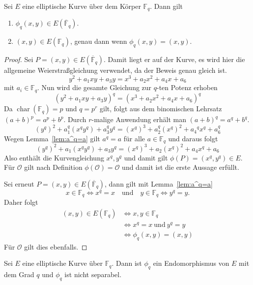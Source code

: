 \begin{lemma}\label{lem:frobenius-fixpunkte}
    Sei $E$ eine elliptische Kurve über dem Körper $\mathbb{F}_q$. Dann gilt
    \begin{enumerate}
        \item \(\phi_q(x,y)\in E(\overline{\mathbb{F}}_q)\).
        \item \((x,y)\in E(\mathbb{F}_q)\), genau dann wenn \(\phi_q(x,y)=(x,y)\).
    \end{enumerate}
\end{lemma}
\begin{proof}
    Sei $P=(x,y)\in E(\overline{\mathbb{F}}_q)$. Damit liegt er auf der Kurve, es wird hier die allgemeine Weierstraßgleichung verwendet, da der Beweis genau gleich ist.
    \[y^2+a_1xy+a_3y=x^3+a_2x^2+a_4x+a_6\] mit $a_i\in \mathbb{F}_q$.
    Nun wird die gesamte Gleichung zur $q$-ten Potenz erhoben
    \[
        {(y^2+a_1xy+a_3y)}^q={(x^3+a_2x^2+a_4x+a_6)}^q
    \]
    Da $\operatorname{char}(\mathbb F_q)=p$ und $q=p^r$ gilt, folgt aus dem binomischen Lehrsatz ${(a+b)}^p=a^p+b^p$. Durch $r$-malige Anwendung erhält man ${(a+b)}^q=a^q+b^q$.
    \[
        {(y^q)}^2+a_1^q(x^q y^q)+a_3^q y^q={(x^q)}^3+a_2^q{(x^q)}^2+{a_4}^q x^q+a_6^q
    \]
    Wegen Lemma~\ref{lem:a^q=a} gilt $a^q=a$ für alle $a\in\mathbb{F}_q$ und daraus folgt
    \[
        {(y^q)}^2+a_1(x^q y^q)+a_3 y^q={(x^q)}^3+a_2{(x^q)}^2+a_4 x^q+a_6
    \]
    Also enthält die Kurvengleichung $x^q,y^q$ und damit gilt $\phi(P)=(x^q,y^q)\in E$. Für $\mathcal{O}$ gilt nach Definition $\phi(\mathcal{O})=\mathcal{O}$ und damit ist die erste Aussage erfüllt.

    Sei erneut $P=(x,y)\in E(\overline{\mathbb F}_q)$, dann gilt mit Lemma~\ref{lem:a^q=a}
    \[
        x\in\mathbb F_q\iff x^q=x
        \quad\text{und}\quad
        y\in\mathbb F_q\iff y^q=y.
    \]
    Daher folgt
    \begin{align*}
        (x,y)\in E(\mathbb{F}_q) & \iff x,y\in\mathbb{F}_q         \\
                                 & \iff x^q=x  \ \text{und}\ y^q=y \\
                                 & \iff \phi_q(x,y)=(x,y)
    \end{align*}
    Für $\mathcal O$ gilt dies ebenfalls.
\end{proof}
\begin{lemma}\label{lem:frobenius-grad}
    Sei $E$ eine elliptische Kurve über \(\mathbb{F}_q\). Dann ist $\phi_q$ ein Endomorphismus von $E$ mit dem Grad $q$ und $\phi_q$ ist nicht separabel.
\end{lemma}
